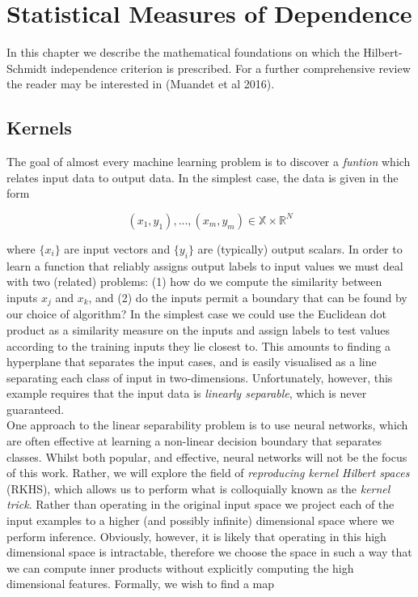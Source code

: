 \chapter{Statistical Measures of Dependence}
\label{hsic}

In this chapter we describe the mathematical foundations on which the Hilbert-Schmidt independence criterion is prescribed. For a further comprehensive review the reader may be interested in (Muandet et al 2016). 


\section{Kernels}

The goal of almost every machine learning problem is to discover a \textit{funtion} which relates input data to output data. In the simplest case, the data is given in the form 

\begin{equation}
(x_1, y_1), ..., (x_m, y_m) \in \mathbb{X} \times \mathbb{R}^N
\end{equation}

\noindent where $\{x_i\}$ are input vectors and $\{y_i\}$ are (typically) output scalars. In order to learn a function that reliably assigns output labels to input values we must deal with two (related) problems: (1) how do we compute the similarity between inputs $x_j$ and $x_k$, and (2) do the inputs permit a boundary that can be found by our choice of algorithm? In the simplest case we could use the Euclidean dot product as a similarity measure on the inputs and assign labels to test values according to the training inputs they lie closest to. This amounts to finding a hyperplane that separates the input cases, and is easily visualised as a line separating each class of input in two-dimensions. Unfortunately, however, this example requires that the input data is \textit{linearly separable}, which is never guaranteed. \\


One approach to the linear separability problem is to use neural networks, which are often effective at learning a non-linear decision boundary that separates classes. Whilst both popular, and effective, neural networks will not be the focus of this work. Rather, we will explore the field of \textit{reproducing kernel Hilbert spaces} (RKHS), which allows us to perform what is colloquially known as the \textit{kernel trick}. Rather than operating in the original input space we project each of the input examples to a higher (and possibly infinite) dimensional space where we perform inference. Obviously, however, it is likely that operating in this high dimensional space is intractable, therefore we choose the space in such a way that we can compute inner products without explicitly computing the high dimensional features. Formally, we wish to find a map

